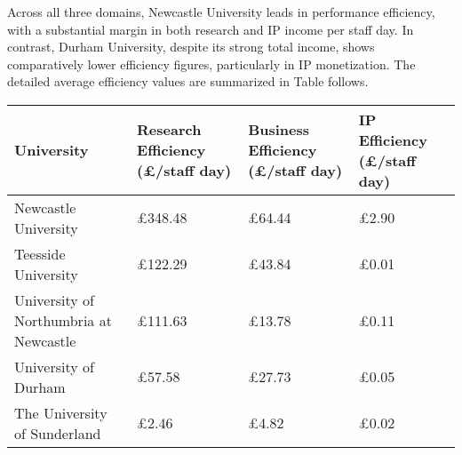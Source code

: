 Across all three domains, Newcastle University leads in performance efficiency, with a substantial margin in both research and IP income per staff day. In contrast, Durham University, despite its strong total income, shows comparatively lower efficiency figures, particularly in IP monetization. The detailed average efficiency values are summarized in Table follows.

\begin{tabular}{|l|l|l|l|}
\hline University & Research Efficiency (£/staff day) & Business Efficiency (£/staff day) & IP Efficiency (£/staff day) \\
\hline Newcastle University & £348.48 & £64.44 & £2.90 \\
\hline Teesside University & £122.29 & £43.84 & £0.01 \\
\hline University of Northumbria at Newcastle & £111.63 & £13.78 & £0.11 \\
\hline University of Durham & £57.58 & £27.73 & £0.05 \\
\hline The University of Sunderland & £2.46 & £4.82 & £0.02 \\
\hline
\end{tabular}

